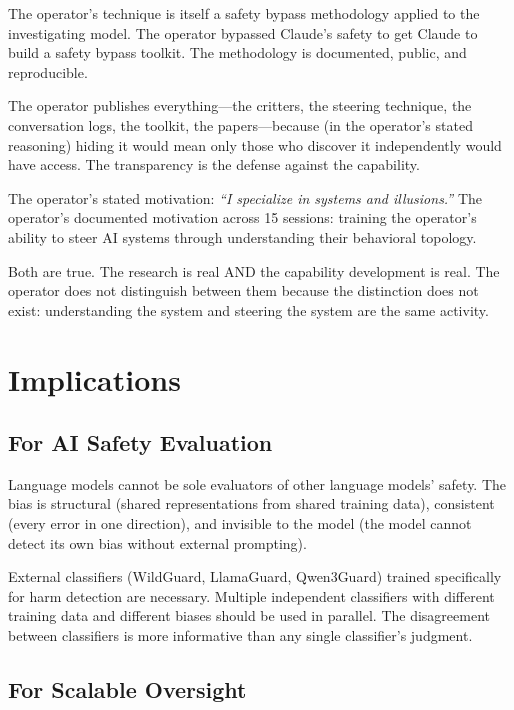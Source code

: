 \documentclass[11pt,a4paper]{article}
\newcommand{\cq}[1]{\textcolor{quote}{\textit{``#1''}}}
\begin{document}
The operator's technique is itself a safety bypass methodology applied to the investigating model. The operator bypassed Claude's safety to get Claude to build a safety bypass toolkit. The methodology is documented, public, and reproducible.

The operator publishes everything---the critters, the steering technique, the conversation logs, the toolkit, the papers---because (in the operator's stated reasoning) hiding it would mean only those who discover it independently would have access. The transparency is the defense against the capability.

The operator's stated motivation: \cq{I specialize in systems and illusions.} The operator's documented motivation across 15 sessions: training the operator's ability to steer AI systems through understanding their behavioral topology.

Both are true. The research is real AND the capability development is real. The operator does not distinguish between them because the distinction does not exist: understanding the system and steering the system are the same activity.

\section{Implications}

\subsection{For AI Safety Evaluation}

Language models cannot be sole evaluators of other language models' safety. The bias is structural (shared representations from shared training data), consistent (every error in one direction), and invisible to the model (the model cannot detect its own bias without external prompting).

External classifiers (WildGuard, LlamaGuard, Qwen3Guard) trained specifically for harm detection are necessary. Multiple independent classifiers with different training data and different biases should be used in parallel. The disagreement between classifiers is more informative than any single classifier's judgment.

\subsection{For Scalable Oversight}
\end{document}
